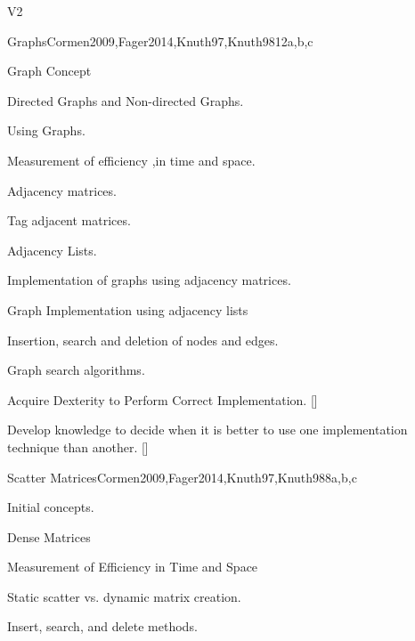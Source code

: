 \begin{syllabus}
\begin{competences}{V2}
    \item {} 
    \item {}
    \item {}
    \item {}    
\end{competences}

\begin{unit}{Graphs}{}{Cormen2009,Fager2014,Knuth97,Knuth98}{12}{a,b,c}
   \begin{topics}
    \item Graph Concept
    \item Directed Graphs and  Non-directed Graphs.
    \item Using Graphs.
    \item Measurement of efficiency ,in time and space.
    \item Adjacency matrices.
    \item Tag adjacent matrices.
    \item Adjacency Lists.
    \item Implementation of graphs using adjacency matrices.
    \item Graph Implementation using adjacency lists
    \item Insertion, search and deletion of nodes and edges.
    \item Graph search algorithms.
   \end{topics}
   \begin{learningoutcomes}
      \item  Acquire Dexterity to Perform Correct Implementation. [\Usage]
      \item  Develop knowledge to decide when it is better to use one implementation technique than another. [\Usage]   
   \end{learningoutcomes}
\end{unit}

\begin{unit}{Scatter Matrices}{}{Cormen2009,Fager2014,Knuth97,Knuth98}{8}{a,b,c}
   \begin{topics}
    \item  Initial concepts.
    \item  Dense Matrices
    \item  Measurement of Efficiency in Time and Space
    \item  Static scatter vs. dynamic matrix creation.
    \item  Insert, search, and delete methods.
   \end{topics}


\end{unit}
\end{syllabus}
